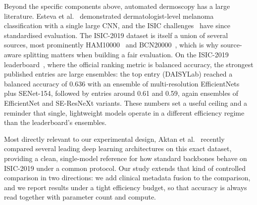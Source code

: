 Beyond the specific components above, automated dermoscopy has a large
literature. Esteva et al.~\cite{esteva2017dermatologist} demonstrated
dermatologist-level melanoma classification with a single large CNN, and the
ISIC challenges~\cite{codella2018skin} have since standardised evaluation. The
ISIC-2019 dataset is itself a union of several sources, most prominently
HAM10000~\cite{tschandl2018ham10000} and BCN20000~\cite{isic2019challenge},
which is why source-aware splitting matters when building a fair evaluation. On
the ISIC-2019 leaderboard~\cite{isic2019leaderboard}, where the official ranking
metric is balanced accuracy, the strongest published entries are large
ensembles: the top entry (DAISYLab) reached a balanced accuracy of 0.636 with an
ensemble of multi-resolution EfficientNets plus SENet-154, followed by entries
around 0.61 and 0.59, again ensembles of EfficientNet and SE-ResNeXt variants.
These numbers set a useful ceiling and a reminder that single, lightweight
models operate in a different efficiency regime than the leaderboard's
ensembles.

Most directly relevant to our experimental design, Aktan et
al.~\cite{aktan2025comparison} recently compared several leading deep learning
architectures on this exact dataset, providing a clean, single-model reference
for how standard backbones behave on ISIC-2019 under a common protocol. Our
study extends that kind of controlled comparison in two directions: we add
clinical metadata fusion to the comparison, and we report results under a tight
efficiency budget, so that accuracy is always read together with parameter count
and compute.

